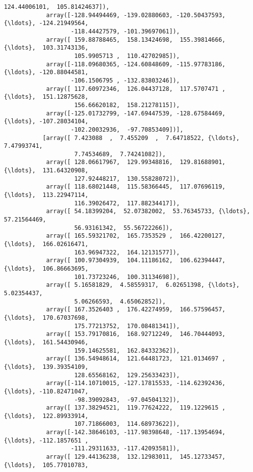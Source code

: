 \documentclass[11pt]{article}
\begin{document}
\begin{Verbatim}[commandchars=\\\{\}]
                    124.44006101,  105.81424637]),
            array([-128.94494469, -139.02880603, -120.50437593, {\ldots}, -124.21949564,
                   -118.44427579, -101.39697061]),
            array([ 159.88788465,  158.13424698,  155.39814666, {\ldots},  103.31743136,
                    105.9905713 ,  110.42702985]),
            array([-118.09680365, -124.60848609, -115.97783186, {\ldots}, -120.88044581,
                   -106.1506795 , -132.83803246]),
            array([ 117.60972346,  126.04437128,  117.5707471 , {\ldots},  151.12875628,
                    156.66620182,  158.21278115]),
            array([-125.01732799, -147.69447539, -128.67584469, {\ldots}, -107.28034104,
                   -102.20032936,  -97.70853409])],
           [array([ 7.423088  ,  7.455209  ,  7.64718522, {\ldots},  7.47993741,
                    7.74534689,  7.74241082]),
            array([ 128.06617967,  129.99348816,  129.81688901, {\ldots},  131.64320908,
                    127.92448217,  130.55828072]),
            array([ 118.68021448,  115.58366445,  117.07696119, {\ldots},  113.22947114,
                    116.39026472,  117.88234417]),
            array([ 54.18399204,  52.07382002,  53.76345733, {\ldots},  57.21564469,
                    56.93161342,  55.56722266]),
            array([ 165.59321702,  165.7353529 ,  166.42200127, {\ldots},  166.02616471,
                    163.96947322,  164.12131577]),
            array([ 100.97304939,  104.11186162,  106.62394447, {\ldots},  106.86663695,
                    101.73723246,  100.31134698]),
            array([ 5.16581829,  4.58559317,  6.02651398, {\ldots},  5.02354437,
                    5.06266593,  4.65062852]),
            array([ 167.3526403 ,  176.42274959,  166.57596457, {\ldots},  170.67037698,
                    175.77213752,  170.08481341]),
            array([ 153.79170816,  168.92712249,  146.70444093, {\ldots},  161.54430946,
                    159.14625581,  162.84332362]),
            array([ 136.54948614,  121.64481723,  121.0134697 , {\ldots},  139.39354109,
                    128.65568162,  129.25633423]),
            array([-114.10710015, -127.17815533, -114.62392436, {\ldots}, -110.82471047,
                    -98.39092843,  -97.04504132]),
            array([ 137.38294521,  119.77624222,  119.1229615 , {\ldots},  122.89933914,
                    107.71866003,  114.68973622]),
            array([-142.38646103, -117.98398648, -117.13954694, {\ldots}, -112.1857651 ,
                   -111.29311633, -117.42093581]),
            array([ 129.44136238,  132.12983011,  145.12733457, {\ldots},  105.77010783,

\end{Verbatim}
\end{document}
